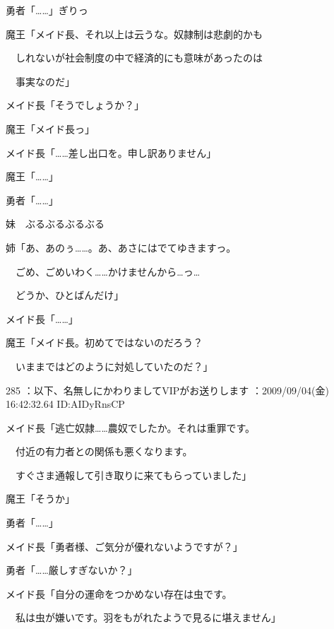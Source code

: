 \documentclass[a4j,twocolumn]{tarticle}
\begin{document}
勇者「……」ぎりっ 



魔王「メイド長、それ以上は云うな。奴隷制は悲劇的かも\par{} 
　しれないが社会制度の中で経済的にも意味があったのは\par{} 
　事実なのだ」\par{} 
メイド長「そうでしょうか？」 



魔王「メイド長っ」\par{} 
メイド長「……差し出口を。申し訳ありません」 



魔王「……」\par{} 
勇者「……」 



妹　ぶるぶるぶるぶる 



姉「あ、あのぅ……。あ、あさにはでてゆきますっ。 \par{}
　ごめ、ごめいわく……かけませんから…っ…\par{} 
　どうか、ひとばんだけ」 



メイド長「……」 



魔王「メイド長。初めてではないのだろう？\par{}
　いままではどのように対処していたのだ？」 

	
    
    

285 ：以下、名無しにかわりましてVIPがお送りします ：2009/09/04(金) 16:42:32.64 ID:AIDyRnsCP 


メイド長「逃亡奴隷……農奴でしたか。それは重罪です。\par{} 
　付近の有力者との関係も悪くなります。\par{} 
　すぐさま通報して引き取りに来てもらっていました」 



魔王「そうか」\par{} 
勇者「……」 



メイド長「勇者様、ご気分が優れないようですが？」\par{} 
勇者「……厳しすぎないか？」 



メイド長「自分の運命をつかめない存在は虫です。\par{} 
　私は虫が嫌いです。羽をもがれたようで見るに堪えません」 
\end{document}
